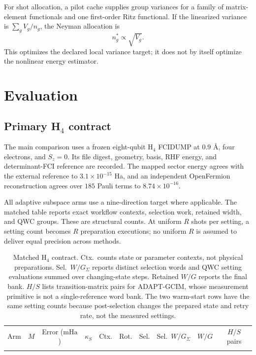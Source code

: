 \documentclass[aps,pra,reprint,superscriptaddress,nofootinbib,floatfix]{revtex4-2}
\newcommand{\mHa}{\mathrm{mHa}}
\begin{document}
For shot allocation, a pilot cache supplies group variances for a family of
matrix-element functionals and one first-order Ritz functional.  If the
linearized variance is \(\sum_g V_g/n_g\), the Neyman allocation is
\begin{equation}
 n_g^* \propto \sqrt{V_g}.
 \label{eq:neyman}
\end{equation}
This optimizes the declared local variance target; it does not by itself
optimize the nonlinear energy estimator.

\section{Evaluation}
\label{sec:evaluation}

\subsection{Primary \texorpdfstring{H$_4$}{H4} contract}
\label{sec:h4-contract}

The main comparison uses a frozen eight-qubit H$_4$ FCIDUMP at \(0.9\) \AA,
four electrons, and \(S_z=0\).  Its file digest, geometry, basis, RHF energy,
and determinant-FCI reference are recorded.  The mapped sector energy agrees
with the external reference to \(3.1\times10^{-15}\) Ha, and an independent
OpenFermion reconstruction agrees over \(185\) Pauli terms to
\(8.74\times10^{-16}\).

All adaptive subspace arms use a nine-direction target where applicable.
The matched table reports exact workflow contexts, selection work, retained
width, and QWC groups.  These are structural counts.  At uniform \(R\) shots
per setting, a setting count becomes \(R\) preparation executions; no uniform
\(R\) is assumed to deliver equal precision across methods.

\begin{table}[t]
\begingroup
\setlength{\tabcolsep}{2pt}
\caption{Matched H$_4$ contract.  Ctx.\ counts state or parameter contexts,
not physical preparations.  Sel.\ \(W/G_\Sigma\) reports distinct selection
words and QWC setting evaluations summed over changing-state steps.  Retained
\(W/G\) reports the final bank.  \(H/S\) lists transition-matrix pairs for
ADAPT-GCIM, whose measurement primitive is not a single-reference word bank.
The two warm-start rows have the same setting counts because post-selection
changes the prepared state and retry rate, not the measured settings.}
\label{tab:matched}
\scriptsize
\begin{ruledtabular}
\begin{tabular}{lccccccccc}
Arm & \(M\) & Error (\(\mHa\)) & \(\kappa_S\) & Ctx. & Rot. & Sel. & Sel.\ \(W/G_\Sigma\) & \(W/G\) & \(H/S\) pairs \\
\colrule

\end{tabular}
\end{ruledtabular}
\endgroup
\end{table}
\end{document}
